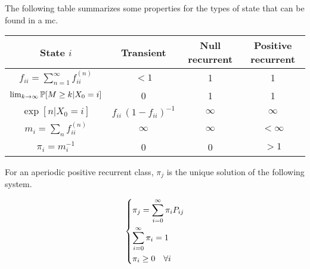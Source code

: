 	\bigbreak
	The following table summarizes some properties for the types of state that can be found in a \gls{mc}.

	\begin{center}
		\begin{tabular}{c c c c}
			\toprule
			State $i$ & Transient & Null recurrent & Positive recurrent \\
			\midrule
			$f_{ii} = \sum_{n=1}^\infty f_{ii}^{(n)}$ & $<1$ & 1 & 1 \\
			\rule{0pt}{4ex}
			$\lim_{k \to \infty } \mathbb{P}[M \geq k | X_0=i]$ & 0 & 1 & 1 \\
			\rule{0pt}{4ex}
			$\exp[n|X_0=i]$ & $f_{ii}\,(1-f_{ii})^{-1}$ & $\infty$ & $\infty$ \\
			\rule{0pt}{4ex}
			$m_i = \sum_n f_{ii}^{(n)}$ & $\infty$ & $\infty$ & $<\infty$ \\
			\rule{0pt}{4ex}
			$\pi_i = m_i^{-1}$ & 0 & 0 & $>1$ \\
			\bottomrule
		\end{tabular}
	\end{center}

	\begin{theorem}
		For an aperiodic positive recurrent class, $\pi_j$ is the unique solution of the following system.

		\begin{equation*}\begin{dcases}
			\pi_j = \sum_{i=0}^\infty \pi_i P_{ij} \\
			\sum_{i=0}^\infty \pi_i = 1 \\
			\pi_i \geq 0 \quad \forall i
		\end{dcases}\end{equation*}
	\end{theorem}


